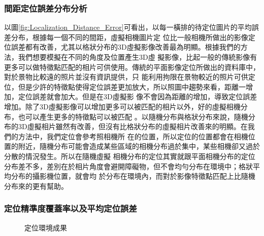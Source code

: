 \subsubsection{間距定位誤差分布分析}	
	
	以圖\ref{fig:Localization_Distance_Error}可看出，以每一橫排的待定位圖片的平均誤差分布，根據每一個不同的間距，虛擬相機圖片定
位比一般相機所做出的影像定位誤差都有改善，尤其以格狀分布的3D虛擬影像改善最為明顯。根據我們的方法，我們想要模擬在不同的角度及位置產生3D虛
擬影像，比起一般的傳統影像有更多可以做特徵點匹配的相片可供使用。傳統的平面影像定位所做出的資料庫中，對於景物比較遠的照片並沒有資訊提供，只
能利用拘限在景物較近的照片可供定位，但是少許的特徵點使得定位誤差更加放大，所以照圖中趨勢來看，距離一增加，定位誤差就會加大。但是在3D虛擬影
像不會因為距離的增加，導致定位誤差增加。除了3D虛擬影像可以增加更多可以被匹配的相片以外，好的虛擬相機分布，也可以產生更多的特徵點可以被匹配
。以隨機分布與格狀分布來說，隨機分布的3D虛擬相片雖然有改善，但沒有比格狀分布的虛擬相片改善來的明顯。在我們的方法中，我們定位會參考照相機所
在的位置，所以定位的位置都會在相機位置的附近，隨機分布可能會造成某些區域的相機分布過於集中，某些相機卻又過於分散的情況發生。所以在隨機虛擬
相機分布的定位其實就跟平面相機分布的定位分布差不多，差別在於相片角度會避開障礙物，但不會均勻分布在環境中；格狀平均分布的攝影機位置，就會均
於分布在環境內，而對於影像特徵點匹配上比隨機分布來的更有幫助。


\subsubsection{定位精準度覆蓋率以及平均定位誤差}	


\begin{figure}
	\begin{center}
	\end{center}
  \caption{定位環境成果}
  \label{fig:Controlled_EV_Result}	
\end{figure}		



